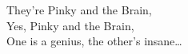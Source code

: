 
\begin{mdframed}[style=pinky]
They're Pinky and the Brain, \\
Yes, Pinky and the Brain, \\
One is a genius, the other's insane\ldots
\end{mdframed}

